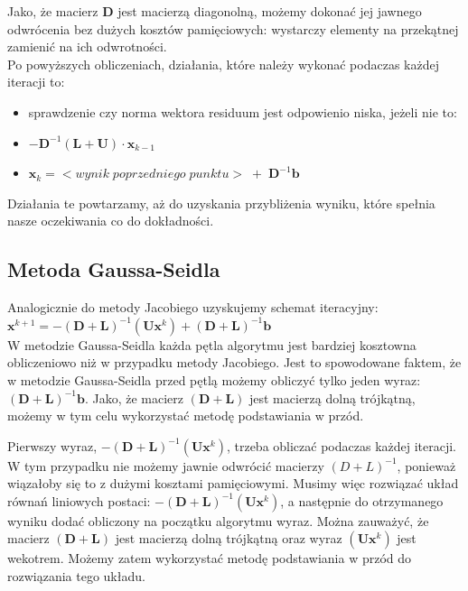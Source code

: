 \documentclass[fleqn]{article}
\begin{document}
    \noindent Jako, że macierz $\bm{D}$ jest macierzą diagonolną, 
    możemy dokonać jej jawnego odwrócenia bez dużych kosztów pamięciowych: wystarczy elementy na przekątnej zamienić na ich 
    odwrotności. \\
    
    \noindent Po powyższych obliczeniach, działania, które należy wykonać podaczas każdej iteracji to:
    \begin{itemize}
        \item sprawdzenie czy norma wektora residuum jest odpowienio niska, jeżeli nie to:
        \item $ -\bm{D}^{-1}(\bm{L} + \bm{U}) \cdot \bm{x}_{k-1}$ 
        \item $ \bm{x}_k = <wynik \; poprzedniego \; punktu> \; + \; \bm{D}^{-1}\bm{b}$
    \end{itemize}

    \noindent Działania te powtarzamy, aż do uzyskania przybliżenia wyniku, które spełnia nasze oczekiwania co do dokładności.


    \subsection{Metoda Gaussa-Seidla}
    Analogicznie do metody Jacobiego uzyskujemy schemat iteracyjny: \\ 

    $\bm{x}^{k+1} = -(\bm{D} + \bm{L})^{-1}(\bm{U}\bm{x}^k) + (\bm{D} + \bm{L})^{-1}\bm{b}$ \\

    \noindent W metodzie Gaussa-Seidla każda pętla algorytmu jest bardziej kosztowna obliczeniowo niż w przypadku metody Jacobiego.
    Jest to spowodowane faktem, że w metodzie Gaussa-Seidla przed pętlą możemy obliczyć tylko jeden wyraz: $(\bm{D} + \bm{L})^{-1}\bm{b}$.
    Jako, że macierz $(\bm{D} + \bm{L})$ jest macierzą dolną trójkątną, możemy w tym celu wykorzystać metodę podstawiania w przód.

    \noindent Pierwszy wyraz, $ -(\bm{D} + \bm{L})^{-1}(\bm{U}\bm{x}^k)$, trzeba obliczać podaczas każdej iteracji.
    W tym przypadku nie możemy jawnie odwrócić macierzy $(D+L)^{-1}$, ponieważ wiązałoby się to z dużymi kosztami pamięciowymi.
    Musimy więc rozwiązać układ równań liniowych postaci: $ -(\bm{D} + \bm{L})^{-1}(\bm{U}\bm{x}^k)$,
    a następnie do otrzymanego wyniku dodać obliczony na początku algorytmu wyraz. Można zauważyć, że macierz $(\bm{D} + \bm{L})$
    jest macierzą dolną trójkątną oraz wyraz $(\bm{U}\bm{x}^k)$ jest wekotrem. Możemy zatem wykorzystać metodę podstawiania w przód do rozwiązania tego układu.
    
\end{document}
